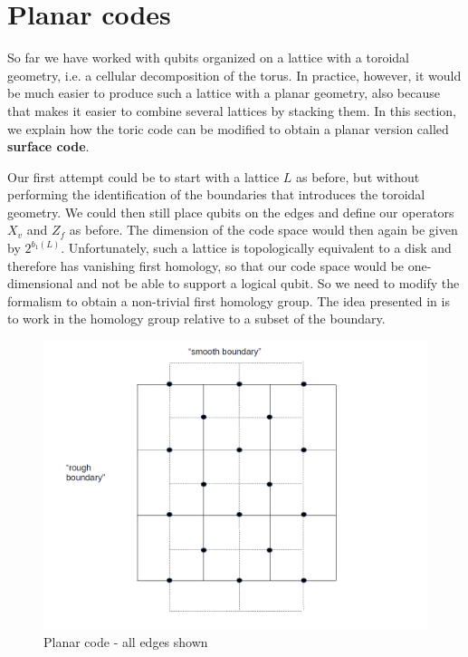 \documentclass[a4paper, draft]{article}
\theoremstyle{own}
\theoremstyle{remark}
\begin{document}
\section{Planar codes}

So far we have worked with qubits organized on a lattice with a toroidal geometry, i.e. a cellular decomposition of the torus. In practice, however, it would be much easier to produce such a lattice with a planar geometry, also because that makes it easier to combine several lattices by stacking them. In this section, we explain how the toric code can be modified to obtain a planar version called {\bf surface code}.

Our first attempt could be to start with a lattice $L$ as before, but without performing the identification of the boundaries that introduces the toroidal geometry. We could then still place qubits on the edges and define our operators $X_v$ and $Z_f$ as before. The dimension of the code space would then again be given by $2^{b_1(L)}$. Unfortunately, such a lattice is topologically equivalent to a disk and therefore has vanishing first homology, so that our code space would be one-dimensional and not be able to support a logical qubit. So we need to modify the formalism to obtain a non-trivial first homology group. The idea presented in \cite{KitaevBravyi} is to work in the homology group relative to a subset of the boundary. 



\begin{figure}[ht]
\centering
\includegraphics[width=0.7\linewidth]{images/PlanarCodeI}
\caption[Planar code - all edges shown]{Planar code - all edges shown}
\label{fig:PlanarCodeI}
\end{figure}
\end{document}
